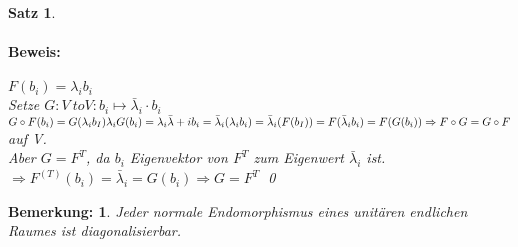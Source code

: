 \documentclass{report}
\newcommand{\lb}{\lambda}
\theoremstyle{customrem}
\newtheorem*{bemerkung}{Bemerkung\textnormal:}
\theoremstyle{customdef}
\newtheorem{satz}[definition]{Satz}
\renewenvironment{proof}{\paragraph{Beweis: }}{\qed}
\theoremstyle{customenv}
\begin{document}
\begin{satz}
\begin{proof}
{        \(F(b_i) = \lb_i b_i\)\\
        Setze \(G : V\ to V : b_i \mapsto \bar\lb_i \cdot b_i\)\\
        \(G \circ F(b_i) = G(\lb_i b_I) \lb_i G(b_i) = \lb_i \bar \lb+i b_i = \bar\lb_i(\lb_i b_i) = \bar\lb_i(F(b_I)) = F(\bar\lb_i b_i) = F(G(b_i))\\
        \Rightarrow F \circ G = G \circ F\) auf V.\\
        Aber \(G = F^T\), da \(b_i\) Eigenvektor von \(F^T\) zum Eigenwert
        \(\bar\lb_i\) ist.\\
        \(\Rightarrow F^(T)(b_i) = \bar\lb_i = G(b_i) \Rightarrow G = F^T\)
    }
  \end{proof}
\end{satz}

\begin{bemerkung} %
  Jeder normale Endomorphismus eines unit\"aren endlichen Raumes ist
  diagonalisierbar.
\end{bemerkung}

\end{document}

